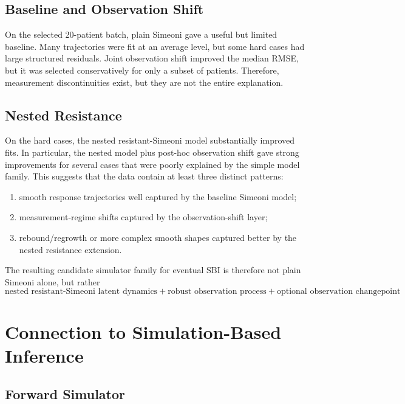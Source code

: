 \documentclass[11pt,a4paper]{article}
\begin{document}
\subsection{Baseline and Observation Shift}

On the selected 20-patient batch, plain Simeoni gave a useful but limited baseline. Many trajectories were fit at an average level, but some hard cases had large structured residuals. Joint observation shift improved the median RMSE, but it was selected conservatively for only a subset of patients. Therefore, measurement discontinuities exist, but they are not the entire explanation.

\subsection{Nested Resistance}

On the hard cases, the nested resistant-Simeoni model substantially improved fits. In particular, the nested model plus post-hoc observation shift gave strong improvements for several cases that were poorly explained by the simple model family. This suggests that the data contain at least three distinct patterns:
\begin{enumerate}[leftmargin=2em]
    \item smooth response trajectories well captured by the baseline Simeoni model;
    \item measurement-regime shifts captured by the observation-shift layer;
    \item rebound/regrowth or more complex smooth shapes captured better by the nested resistance extension.
\end{enumerate}

The resulting candidate simulator family for eventual SBI is therefore not plain Simeoni alone, but rather
\[
\boxed{
    \text{nested resistant-Simeoni latent dynamics}
    + \text{robust observation process}
    + \text{optional observation changepoint}
}
\]

\section{Connection to Simulation-Based Inference}

\subsection{Forward Simulator}
\end{document}
